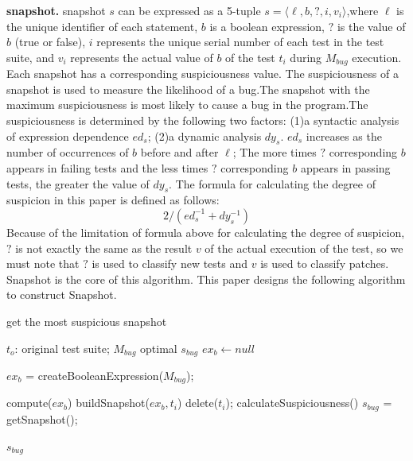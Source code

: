 \textbf{snapshot.} snapshot $s$ can be expressed as a 5-tuple $s= \langle \ell,b,?,i,v_i \rangle$,where $\ell$ is the unique identifier of each statement, $b$ is a boolean expression, $?$ is the value of $b$ (true or false), $i$ represents the unique serial number of each test in the test suite, and $v_i$ represents the actual value of $b$ of the test $t_i$ during $M_{bug}$ execution. Each snapshot has a corresponding suspiciousness value. The suspiciousness of a snapshot is used to measure the likelihood of a bug.The snapshot with the maximum suspiciousness is most likely to cause a bug in the program.The suspiciousness is determined by the following two factors: (1)a syntactic analysis of expression dependence $ed_s$; (2)a dynamic analysis $dy_s$. $ed_s$ increases as the number of occurrences of $b$ before and after $\ell$; The more times $?$ corresponding $b$ appears in failing tests and the less times $?$ corresponding $b$ appears in passing tests, the greater the value of $dy_s$. The formula\cite{ref57} for calculating the degree of suspicion in this paper is defined as follows:
\begin{equation}
	2/({ed_s^{-1}}+dy_s^{-1})
\end{equation}
Because of the limitation of formula above for calculating the degree of suspicion, $?$ is not exactly the same as the result $v$ of the actual execution of the test, so we must note that $?$ is used to classify new tests and $v$ is used to classify patches. Snapshot is the core of this algorithm. This paper designs the following algorithm to construct Snapshot.
\begin{algorithm}
	\caption{get the most suspicious snapshot}\label{algo1}
	\begin{algorithmic}[1] 
		\Require
		$t_o$: original test suite;
		$M_{bug}$
		\Ensure
		optimal $s_{bug}$
		\State $ex_b \gets null$
		
		\State $ex_b$ = createBooleanExpression($M_{bug}$);
		
		
		
		 \State  compute($ex_b$) \State
		buildSnapshot($ex_b,t_i$)
		\Else \State delete($t_i$);
		\EndIf
		\EndFor
		\State
		calculateSuspiciousness()
		\State $s_{bug}$ = getSnapshot();
		
		\Return $s_{bug}$
		\EndFunction
		
	\end{algorithmic}
\end{algorithm}

